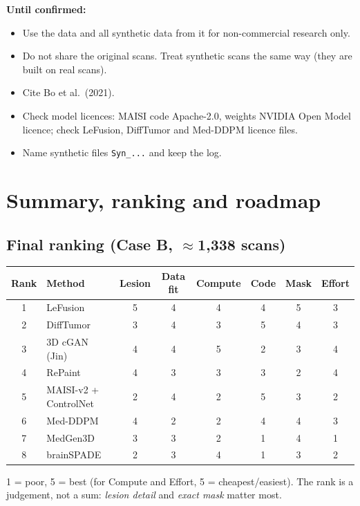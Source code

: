 \documentclass[11pt,a4paper,oneside]{report}
\begin{document}
\textbf{Until confirmed:}
\begin{itemize}
  \item Use the data and all synthetic data from it for non-commercial research only.
  \item Do not share the original scans. Treat synthetic scans the same way (they are built on real scans).
  \item Cite Bo et al.\ (2021).
  \item Check model licences: MAISI code Apache-2.0, weights NVIDIA Open Model licence; check LeFusion, DiffTumor and Med-DDPM licence files.
  \item Name synthetic files \texttt{Syn\_...} and keep the log.
\end{itemize}

\chapter{Summary, ranking and roadmap}\label{ch:summary}

\section*{Final ranking (Case B, $\approx$1{,}338 scans)}
\begin{center}
\small
\begin{tabular}{clcccccc}
\toprule
\textbf{Rank} & \textbf{Method} & \textbf{Lesion} & \textbf{Data fit} & \textbf{Compute} & \textbf{Code} & \textbf{Mask} & \textbf{Effort} \\
\midrule
1 & LeFusion & 5 & 4 & 4 & 4 & 5 & 3 \\
2 & DiffTumor & 3 & 4 & 3 & 5 & 4 & 3 \\
3 & 3D cGAN (Jin) & 4 & 4 & 5 & 2 & 3 & 4 \\
4 & RePaint & 4 & 3 & 3 & 3 & 2 & 4 \\
5 & MAISI-v2 + ControlNet & 2 & 4 & 2 & 5 & 3 & 2 \\
6 & Med-DDPM & 4 & 2 & 2 & 4 & 4 & 3 \\
7 & MedGen3D & 3 & 3 & 2 & 1 & 4 & 1 \\
8 & brainSPADE & 2 & 3 & 4 & 1 & 3 & 2 \\
\bottomrule
\end{tabular}
\end{center}
1 = poor, 5 = best (for Compute and Effort, 5 = cheapest/easiest). The rank is a judgement, not a sum: \emph{lesion detail} and \emph{exact mask} matter most.
\end{document}

